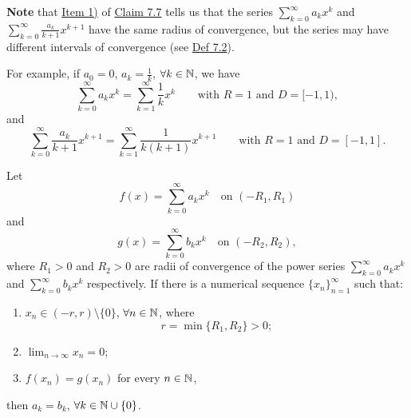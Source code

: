 \textbf{Note} that \hyperref[item:claim:7.7:1]{Item 1)} of \hyperref[claim:7.7]{Claim 7.7} tells us that the series $\sum_{k=0}^{\infty}a_kx^k$ and $\sum_{k=0}^{\infty}\frac{a_k}{k+1}x^{k+1}$ have the same radius of convergence, but the series may have different intervals of convergence (see \hyperref[def:7.2]{Def 7.2}).

For example, if $a_0=0$, $a_k=\frac{1}{k}$, $\forall k\in\mathbb{N}$, we have
\[
\sum_{k=0}^{\infty}a_kx^k
=
\sum_{k=1}^{\infty}\frac{1}{k}x^k
\qquad\text{with }R=1\text{ and }D=[-1,1),
\]
and
\[
\sum_{k=0}^{\infty}\frac{a_k}{k+1}x^{k+1}
=
\sum_{k=1}^{\infty}\frac{1}{k(k+1)}x^{k+1}
\qquad\text{with }R=1\text{ and }D=[-1,1].
\]

\begin{claim}\label{claim:7.8}
Let
\[
f(x)=\sum_{k=0}^{\infty}a_kx^k\quad\text{on }(-R_1,R_1)
\]
and
\[
g(x)=\sum_{k=0}^{\infty}b_kx^k\quad\text{on }(-R_2,R_2),
\]
where $R_1>0$ and $R_2>0$ are radii of convergence of the power series $\sum_{k=0}^{\infty}a_kx^k$ and $\sum_{k=0}^{\infty}b_kx^k$ respectively.
If there is a numerical sequence $\{x_n\}_{n=1}^{\infty}$ such that:
\begin{enumerate}[label=\alph*)]
    \item\label{item:claim:7.8:a} $x_n\in(-r,r)\setminus\{0\}$, $\forall n\in\mathbb{N}$, where
    \[
    r=\min\{R_1,R_2\}>0;
    \]
    \item\label{item:claim:7.8:b} $\displaystyle\lim_{n\to\infty}x_n=0$;
    \item\label{item:claim:7.8:c} $f(x_n)=g(x_n)$ for every $n\in\mathbb{N}$,
\end{enumerate}
then $a_k=b_k$, $\forall k\in\mathbb{N}\cup\{0\}$.
\end{claim}


